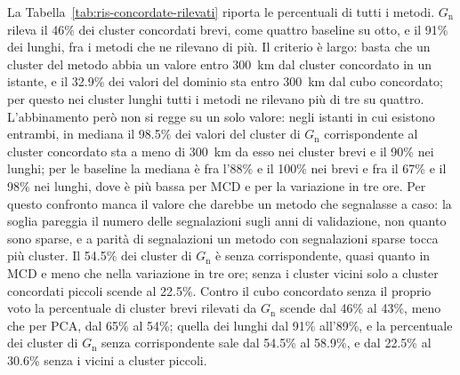 La Tabella~\ref{tab:ris-concordate-rilevati} riporta le percentuali di tutti i metodi. $G_{\mathrm{n}}$ rileva il 46\% dei cluster concordati brevi, come quattro baseline su otto, e il 91\% dei lunghi, fra i metodi che ne rilevano di più. Il criterio è largo: basta che un cluster del metodo abbia un valore entro 300~km dal cluster concordato in un istante, e il 32.9\% dei valori del dominio sta entro 300~km dal cubo concordato; per questo nei cluster lunghi tutti i metodi ne rilevano più di tre su quattro. L'abbinamento però non si regge su un solo valore: negli istanti in cui esistono entrambi, in mediana il 98.5\% dei valori del cluster di $G_{\mathrm{n}}$ corrispondente al cluster concordato sta a meno di 300~km da esso nei cluster brevi e il 90\% nei lunghi; per le baseline la mediana è fra l'88\% e il 100\% nei brevi e fra il 67\% e il 98\% nei lunghi, dove è più bassa per MCD e per la variazione in tre ore. Per questo confronto manca il valore che darebbe un metodo che segnalasse a caso: la soglia pareggia il numero delle segnalazioni sugli anni di validazione, non quanto sono sparse, e a parità di segnalazioni un metodo con segnalazioni sparse tocca più cluster. Il 54.5\% dei cluster di $G_{\mathrm{n}}$ è senza corrispondente, quasi quanto in MCD e meno che nella variazione in tre ore; senza i cluster vicini solo a cluster concordati piccoli scende al 22.5\%. Contro il cubo concordato senza il proprio voto la percentuale di cluster brevi rilevati da $G_{\mathrm{n}}$ scende dal 46\% al 43\%, meno che per PCA, dal 65\% al 54\%; quella dei lunghi dal 91\% all'89\%, e la percentuale dei cluster di $G_{\mathrm{n}}$ senza corrispondente sale dal 54.5\% al 58.9\%, e dal 22.5\% al 30.6\% senza i vicini a cluster piccoli.

